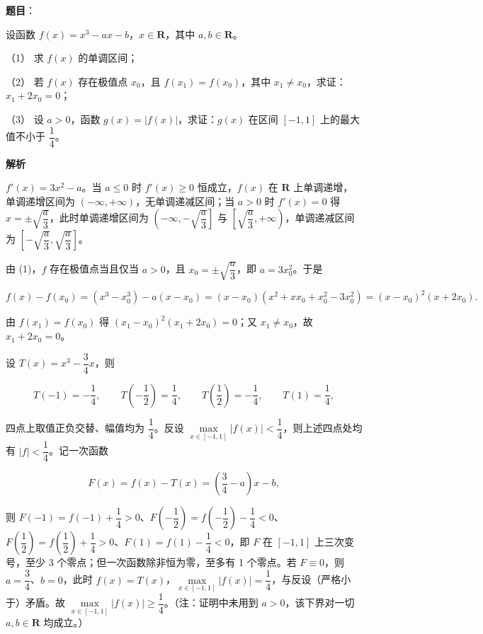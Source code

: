 \begin{answer}

\textbf{题目}：

设函数 \(f(x)=x^{3}-ax-b\)，\(x\in\mathbf{R}\)，其中 \(a,b\in\mathbf{R}\)。

（1） 求 \(f(x)\) 的单调区间；

（2） 若 \(f(x)\) 存在极值点 \(x_{0}\)，且 \(f(x_{1})=f(x_{0})\)，其中 \(x_{1}\neq x_{0}\)，求证：\(x_{1}+2x_{0}=0\)；

（3） 设 \(a>0\)，函数 \(g(x)=|f(x)|\)，求证：\(g(x)\) 在区间 \([-1,1]\) 上的最大值不小于 \(\dfrac{1}{4}\)。

\textbf{解析}


\(f'(x)=3x^{2}-a\)。当 \(a\leqslant 0\) 时 \(f'(x)\geqslant 0\) 恒成立，\(f(x)\) 在 \(\mathbf{R}\) 上单调递增，单调递增区间为 \((-\infty,+\infty)\)，无单调递减区间；当 \(a>0\) 时 \(f'(x)=0\) 得 \(x=\pm\sqrt{\dfrac{a}{3}}\)，此时单调递增区间为 \(\left(-\infty,-\sqrt{\dfrac{a}{3}}\right]\) 与 \(\left[\sqrt{\dfrac{a}{3}},+\infty\right)\)，单调递减区间为 \(\left[-\sqrt{\dfrac{a}{3}},\sqrt{\dfrac{a}{3}}\right]\)。


由 (1)，\(f\) 存在极值点当且仅当 \(a>0\)，且 \(x_{0}=\pm\sqrt{\dfrac{a}{3}}\)，即 \(a=3x_{0}^{2}\)。于是

\nopagebreak[4]
\[
f(x)-f(x_{0})=\left(x^{3}-x_{0}^{3}\right)-a(x-x_{0})=(x-x_{0})\left(x^{2}+xx_{0}+x_{0}^{2}-3x_{0}^{2}\right)=(x-x_{0})^{2}(x+2x_{0}).
\]

由 \(f(x_{1})=f(x_{0})\) 得 \((x_{1}-x_{0})^{2}(x_{1}+2x_{0})=0\)；又 \(x_{1}\neq x_{0}\)，故 \(x_{1}+2x_{0}=0\)。


设 \(T(x)=x^{3}-\dfrac{3}{4}x\)，则

\nopagebreak[4]
\[
T(-1)=-\dfrac{1}{4},\qquad T\left(-\dfrac{1}{2}\right)=\dfrac{1}{4},\qquad T\left(\dfrac{1}{2}\right)=-\dfrac{1}{4},\qquad T(1)=\dfrac{1}{4},
\]

四点上取值正负交替、幅值均为 \(\dfrac{1}{4}\)。反设 \(\max\limits_{x\in[-1,1]}|f(x)|<\dfrac{1}{4}\)，则上述四点处均有 \(|f|<\dfrac{1}{4}\)。记一次函数

\nopagebreak[4]
\[
F(x)=f(x)-T(x)=\left(\dfrac{3}{4}-a\right)x-b,
\]

则 \(F(-1)=f(-1)+\dfrac{1}{4}>0\)、\(F\left(-\dfrac{1}{2}\right)=f\left(-\dfrac{1}{2}\right)-\dfrac{1}{4}<0\)、\(F\left(\dfrac{1}{2}\right)=f\left(\dfrac{1}{2}\right)+\dfrac{1}{4}>0\)、\(F(1)=f(1)-\dfrac{1}{4}<0\)，即 \(F\) 在 \([-1,1]\) 上三次变号，至少 3 个零点；但一次函数除非恒为零，至多有 1 个零点。若 \(F\equiv 0\)，则 \(a=\dfrac{3}{4}\)、\(b=0\)，此时 \(f(x)=T(x)\)，\(\max\limits_{x\in[-1,1]}|f(x)|=\dfrac{1}{4}\)，与反设（严格小于）矛盾。故 \(\max\limits_{x\in[-1,1]}|f(x)|\geqslant\dfrac{1}{4}\)。（注：证明中未用到 \(a>0\)，该下界对一切 \(a,b\in\mathbf{R}\) 均成立。）


\end{answer}
